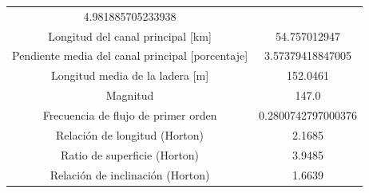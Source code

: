 \documentclass[11pt,]{article}
\begin{document}
\begin{longtable}[]{@{}cc@{}}
\begin{minipage}[t]{0.19\columnwidth}
4.981885705233938\strut
\end{minipage}\tabularnewline
\begin{minipage}[t]{0.75\columnwidth}\centering\strut
Longitud del canal principal {[}km{]}\strut
\end{minipage} & \begin{minipage}[t]{0.19\columnwidth}\centering\strut
54.757012947\strut
\end{minipage}\tabularnewline
\begin{minipage}[t]{0.75\columnwidth}\centering\strut
Pendiente media del canal principal {[}porcentaje{]}\strut
\end{minipage} & \begin{minipage}[t]{0.19\columnwidth}\centering\strut
3.57379418847005\strut
\end{minipage}\tabularnewline
\begin{minipage}[t]{0.75\columnwidth}\centering\strut
Longitud media de la ladera {[}m{]}\strut
\end{minipage} & \begin{minipage}[t]{0.19\columnwidth}\centering\strut
152.0461\strut
\end{minipage}\tabularnewline
\begin{minipage}[t]{0.75\columnwidth}\centering\strut
Magnitud\strut
\end{minipage} & \begin{minipage}[t]{0.19\columnwidth}\centering\strut
147.0\strut
\end{minipage}\tabularnewline
\begin{minipage}[t]{0.75\columnwidth}\centering\strut
Frecuencia de flujo de primer orden\strut
\end{minipage} & \begin{minipage}[t]{0.19\columnwidth}\centering\strut
0.2800742797000376\strut
\end{minipage}\tabularnewline
\begin{minipage}[t]{0.75\columnwidth}\centering\strut
Relación de longitud (Horton)\strut
\end{minipage} & \begin{minipage}[t]{0.19\columnwidth}\centering\strut
2.1685\strut
\end{minipage}\tabularnewline
\begin{minipage}[t]{0.75\columnwidth}\centering\strut
Ratio de superficie (Horton)\strut
\end{minipage} & \begin{minipage}[t]{0.19\columnwidth}\centering\strut
3.9485\strut
\end{minipage}\tabularnewline
\begin{minipage}[t]{0.75\columnwidth}\centering\strut
Relación de inclinación (Horton)\strut
\end{minipage} & \begin{minipage}[t]{0.19\columnwidth}\centering\strut
1.6639\strut
\end{minipage}\tabularnewline
\bottomrule
\end{longtable}
\end{document}
